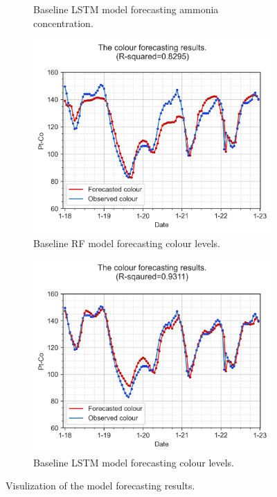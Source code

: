 \begin{figure}[h]
\begin{subfigure}[t]{0.45\textwidth}
      \caption{Baseline LSTM model forecasting ammonia concentration.} \label{fig:baseline-nh3-plot-lstm}
    \end{subfigure}%
    \hspace{1em}%
    \begin{subfigure}[t]{0.45\textwidth}
      \includegraphics[width=\linewidth]{imgs/results/ammonia-colour-forecast-plot/00-RF_1_pred_Step1-obs-colour.png}
      \caption{Baseline RF model forecasting colour levels.} \label{fig:baseline-colour-plot-rf}
    \end{subfigure}%
    \hspace{1em}%
    \begin{subfigure}[t]{0.45\textwidth}
      \includegraphics[width=\linewidth]{imgs/results/ammonia-colour-forecast-plot/00-LSTM_1_pred_Step1-obs-colour.png}
      \caption{Baseline LSTM model forecasting colour levels.} \label{fig:baseline-colour-plot-lstm}
    \end{subfigure}%
  \caption{Visulization of the model forecasting results.} \label{fig:baseline-plot}
\end{figure}

